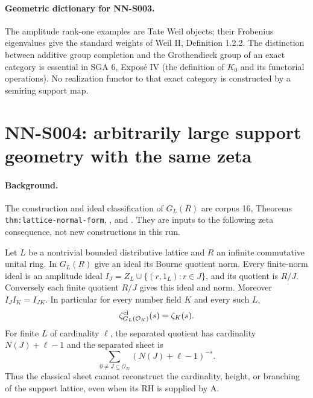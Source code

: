 \paragraph{Geometric dictionary for NN-S003.}
The amplitude rank-one examples are Tate Weil objects; their
Frobenius eigenvalues give the standard weights of Weil II,
Definition 1.2.2. The distinction between additive group completion
and the Grothendieck group of an exact category is essential in
SGA 6, Expos\'e IV (the definition of $K_0$ and its functorial
operations). No realization functor to that exact category is
constructed by a semiring support map.



\section{NN-S004: arbitrarily large support geometry with the same zeta}
\label{sec:NN-S004}

\paragraph{Background.} The construction and ideal classification
of $G_L(R)$ are corpus 16, Theorems \texttt{thm:lattice-normal-form},
, and
. They are inputs to the
following zeta consequence, not new constructions in this run.

\begin{theorem}[NN-S004]
Let $L$ be a nontrivial bounded distributive lattice and $R$ an
infinite commutative unital ring. In $G_L(R)$ give an ideal its Bourne quotient norm.
Every finite-norm ideal is an amplitude ideal
$I_J=Z_L\cup\{(r,1_L):r\in J\}$, and its quotient is $R/J$.
Conversely each finite quotient $R/J$ gives this ideal and norm.
Moreover $I_JI_K=I_{JK}$. In particular for every number field $K$
and every such $L$,
\[
 \zeta^{\rm cl}_{G_L(\mathcal O_K)}(s)=\zeta_K(s).
\]
For finite $L$ of cardinality $\ell$, the separated quotient has
cardinality $N(J)+\ell-1$ and the separated sheet is
\[
 \sum_{0\ne J\subseteq\mathcal O_K}(N(J)+\ell-1)^{-s}.
\]
Thus the classical sheet cannot reconstruct the cardinality, height,
or branching of the support lattice, even when its RH is supplied by A.
\end{theorem}

